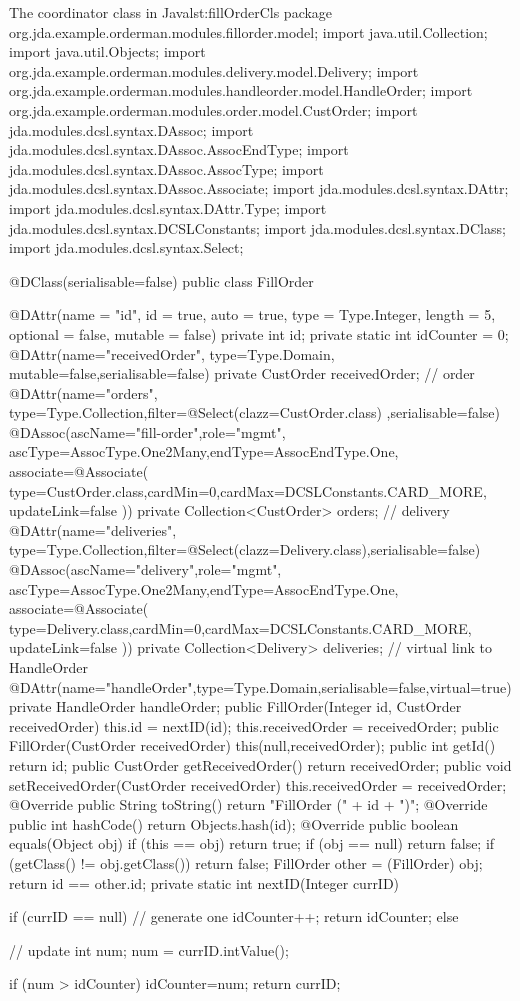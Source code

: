 \begin{lstcodeplainssm}{The coordinator class  in Java}{lst:fillOrderCls}
package org.jda.example.orderman.modules.fillorder.model;
import java.util.Collection;
import java.util.Objects;
import org.jda.example.orderman.modules.delivery.model.Delivery;
import org.jda.example.orderman.modules.handleorder.model.HandleOrder;
import org.jda.example.orderman.modules.order.model.CustOrder;
import jda.modules.dcsl.syntax.DAssoc;
import jda.modules.dcsl.syntax.DAssoc.AssocEndType;
import jda.modules.dcsl.syntax.DAssoc.AssocType;
import jda.modules.dcsl.syntax.DAssoc.Associate;
import jda.modules.dcsl.syntax.DAttr;
import jda.modules.dcsl.syntax.DAttr.Type;
import jda.modules.dcsl.syntax.DCSLConstants;
import jda.modules.dcsl.syntax.DClass;
import jda.modules.dcsl.syntax.Select;

@DClass(serialisable=false)
public class FillOrder {
	@DAttr(name = "id", id = true, auto = true, type = Type.Integer, length = 5, 
	optional = false, mutable = false)
	private int id;
	private static int idCounter = 0;
	@DAttr(name="receivedOrder", type=Type.Domain, mutable=false,serialisable=false)
	private CustOrder receivedOrder;	
	// order 
	@DAttr(name="orders", type=Type.Collection,filter=@Select(clazz=CustOrder.class)
	,serialisable=false)
	@DAssoc(ascName="fill-order",role="mgmt",
	ascType=AssocType.One2Many,endType=AssocEndType.One,
	associate=@Associate(
	type=CustOrder.class,cardMin=0,cardMax=DCSLConstants.CARD_MORE,
	updateLink=false
	))
	private Collection<CustOrder> orders;	
	// delivery 
	@DAttr(name="deliveries", type=Type.Collection,filter=@Select(clazz=Delivery.class),serialisable=false)
	@DAssoc(ascName="delivery",role="mgmt",
	ascType=AssocType.One2Many,endType=AssocEndType.One,
	associate=@Associate(
	type=Delivery.class,cardMin=0,cardMax=DCSLConstants.CARD_MORE,
	updateLink=false
	))
	private Collection<Delivery> deliveries;	
	// virtual link to HandleOrder
	@DAttr(name="handleOrder",type=Type.Domain,serialisable=false,virtual=true)
	private HandleOrder handleOrder;	
	public FillOrder(Integer id, CustOrder receivedOrder) {
		this.id = nextID(id);
		this.receivedOrder = receivedOrder;
	}	
	public FillOrder(CustOrder receivedOrder) {
		this(null,receivedOrder);
	}
	public int getId() {
		return id;
	}
	public CustOrder getReceivedOrder() {
		return receivedOrder;
	}
	public void setReceivedOrder(CustOrder receivedOrder) {
		this.receivedOrder = receivedOrder;
	}
	@Override
	public String toString() {
		return "FillOrder (" + id + ")";
	}
	@Override
	public int hashCode() {
		return Objects.hash(id);
	}
	@Override
	public boolean equals(Object obj) {
		if (this == obj)
		return true;
		if (obj == null)
		return false;
		if (getClass() != obj.getClass())
		return false;
		FillOrder other = (FillOrder) obj;
		return id == other.id;
	}	
	private static int nextID(Integer currID) {
		if (currID == null) { // generate one
			idCounter++;
			return idCounter;
		} else { // update
			int num;
			num = currID.intValue();
			
			if (num > idCounter) {
				idCounter=num;
			}   
			return currID;
		}
	}
}
\end{lstcodeplainssm}	
	